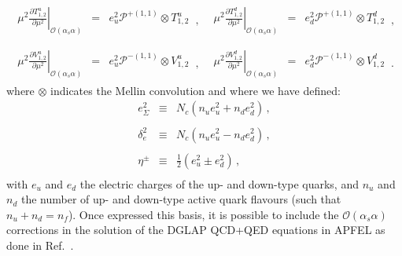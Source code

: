 \begin{equation}
\begin{array}{ll}
\begin{array}{rcl}
\displaystyle \left.\mu^2\frac{\partial T^u_{1,2}}{\partial \mu^2}\right|_{\mathcal{O}(\alpha_s \alpha)} &=&
\displaystyle e_u^2\mathcal{P}^{+(1,1)}\otimes T^u_{1,2}
\end{array}\,, &
\begin{array}{rcl}
\displaystyle \left.\mu^2\frac{\partial T^d_{1,2}}{\partial \mu^2}\right|_{\mathcal{O}(\alpha_s \alpha)} &=&
\displaystyle e_d^2\mathcal{P}^{+(1,1)} \otimes T^d_{1,2}
\end{array}\,,
\\
\\
\begin{array}{rcl}
\displaystyle \left.\mu^2\frac{\partial V^u_{1,2}}{\partial \mu^2}\right|_{\mathcal{O}(\alpha_s \alpha)} &=&
\displaystyle e_u^2\mathcal{P}^{-(1,1)} \otimes V^u_{1,2}
\end{array}\,, &
\begin{array}{rcl}
\displaystyle \left.\mu^2\frac{\partial V^d_{1,2}}{\partial \mu^2}\right|_{\mathcal{O}(\alpha_s \alpha)} &=&
\displaystyle e_d^2\mathcal{P}^{-(1,1)}\otimes V^d_{1,2}
\end{array}\,.
\end{array}
\end{equation}
where $\otimes$ indicates the Mellin convolution and where we have
defined:
\begin{equation}
\begin{array}{rcl}
e_{\Sigma}^{2}& \equiv &\displaystyle
N_c(n_ue_{u}^{2}+n_de_{d}^{2})\,,\\
\\
\delta_e^2 & \equiv &\displaystyle N_c(n_u e_u^2 -n_d e_d^2)\,,\\
\\
\eta^{\pm} & \equiv & \displaystyle \frac{1}{2}\left(e_{u}^{2}\pm
  e_{d}^{2}\right)\,,\\
\end{array}
\end{equation}
with $e_u$ and $e_d$ the electric charges of the up- and down-type
quarks, and $n_u$ and $n_d$ the number of up- and down-type active
quark flavours (such that $n_u+n_d=n_f$).
%
Once expressed this basis, it is possible to include
the $\mathcal{O}(\alpha_s\alpha)$ corrections
in the solution of the DGLAP QCD+QED equations
in APFEL as done in Ref.~\cite{Bertone:2015lqa}.

